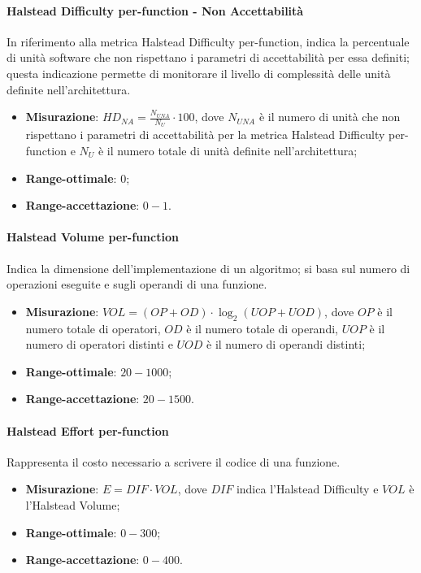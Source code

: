 \paragraph{Halstead Difficulty per-function - Non Accettabilità}
\label{halDiffNA}
In riferimento alla metrica Halstead Difficulty per-function, indica la percentuale di unità software che non rispettano i parametri di accettabilità per essa definiti; questa indicazione permette di monitorare il livello di complessità delle unità definite nell'architettura.
\begin{itemize}
\item \textbf{Misurazione}: $HD_{NA}=\frac{N_{UNA}}{N_{U}} \cdot 100$, dove $N_{UNA}$ è il numero di unità che non rispettano i parametri di accettabilità per la metrica Halstead Difficulty per-function e $N_{U}$ è il numero totale di unità definite nell'architettura;
\item \textbf{Range-ottimale}: $0$;
\item \textbf{Range-accettazione}: $0 - 1$.
\end{itemize}
\paragraph{Halstead Volume per-function}
\label{halVolume}
Indica la dimensione dell'implementazione di un algoritmo; si basa sul numero di operazioni eseguite e sugli operandi di una funzione.
\begin{itemize}
\item \textbf{Misurazione}: $VOL = (OP + OD) \cdot \log_{2}(UOP + UOD)$, dove $OP$ è il numero totale di operatori, $OD$ è il numero totale di operandi, $UOP$ è il numero di operatori distinti e $UOD$ è il numero di operandi distinti;
\item \textbf{Range-ottimale}: $20 - 1000$;
\item \textbf{Range-accettazione}: $20 - 1500$.
\end{itemize}
\paragraph{Halstead Effort per-function}
\label{halEffort}
Rappresenta il costo necessario a scrivere il codice di una funzione.
\begin{itemize}
\item \textbf{Misurazione}: $E = DIF \cdot VOL$, dove $DIF$ indica l'Halstead Difficulty e $VOL$ è l'Halstead Volume;
\item \textbf{Range-ottimale}: $0 - 300$;
\item \textbf{Range-accettazione}: $0 - 400$.
\end{itemize}
